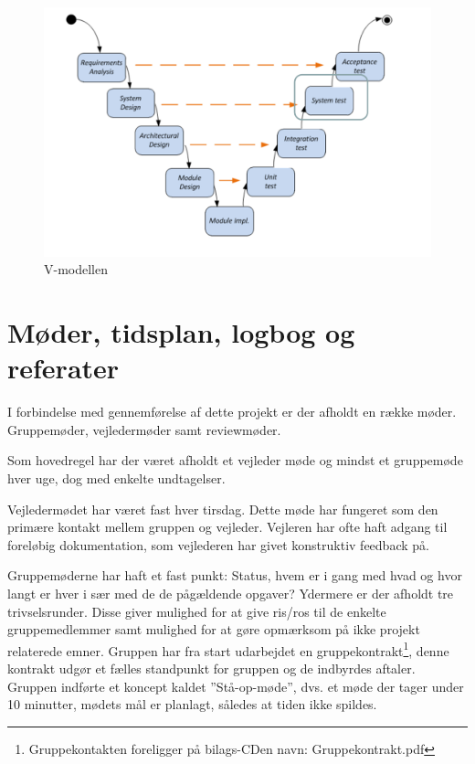 \begin{figure}[h]
  \centering
    \includegraphics[width=\textwidth]{Billeder/V_modellen}
    \caption{V-modellen}
    \label{fig:V_modellen}
\end{figure}

\section{Møder, tidsplan, logbog og referater}

I forbindelse med gennemførelse af dette projekt er der afholdt en række møder. Gruppemøder, vejledermøder samt reviewmøder. 

Som hovedregel har der været afholdt et vejleder møde og mindst et gruppemøde hver uge, dog med enkelte undtagelser. 

Vejledermødet har været fast hver tirsdag. Dette møde har fungeret som den primære kontakt mellem gruppen og vejleder. Vejleren har ofte haft adgang til foreløbig dokumentation, som vejlederen har givet konstruktiv feedback på.

Gruppemøderne har haft et fast punkt: Status, hvem er i gang med hvad og hvor langt er hver i sær med de de pågældende opgaver? Ydermere er der afholdt tre trivselsrunder. Disse giver mulighed for at give ris/ros til de enkelte gruppemedlemmer samt mulighed for at gøre opmærksom på ikke projekt relaterede emner. 
Gruppen har fra start udarbejdet en gruppekontrakt\footnote{Gruppekontakten foreligger på bilags-CDen navn: Gruppekontrakt.pdf}, denne kontrakt udgør et fælles standpunkt for gruppen og de indbyrdes aftaler. Gruppen indførte et koncept kaldet ''Stå-op-møde'', dvs. et møde der tager under 10 minutter, mødets mål er planlagt, således at tiden ikke spildes. 

